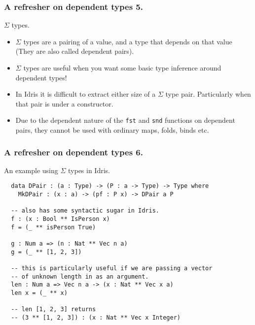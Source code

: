 \documentclass{beamer}
\begin{document}
\begin{frame}[fragile]
  \frametitle{A refresher on dependent types 5.}
  \begin{block}{$\Sigma$ types.}
  \begin{itemize}
    \item $\Sigma$ types are a pairing of a value, and a type that
            depends on that value (They are also called dependent
                  pairs).
    \item $\Sigma$ types are useful when you want some basic type
            inference around dependent types!
    \item In Idris it is difficult to extract either size of a $\Sigma$
          type pair. Particularly when that pair is under a
          constructor.
    \item Due to the dependent nature of the
            \texttt{fst} and \texttt{snd}
            functions on dependent pairs, they cannot be used with
            ordinary maps, folds, binds etc.
  \end{itemize}
  \end{block}
\end{frame}

\begin{frame}[fragile]
  \frametitle{A refresher on dependent types 6.}
  \begin{block}{An example using $\Sigma$ types in Idris.}
  \begin{verbatim}
  data DPair : (a : Type) -> (P : a -> Type) -> Type where
    MkDPair : (x : a) -> (pf : P x) -> DPair a P

  -- also has some syntactic sugar in Idris.
  f : (x : Bool ** IsPerson x)
  f = (_ ** isPerson True)

  g : Num a => (n : Nat ** Vec n a)
  g = (_ ** [1, 2, 3])

  -- this is particularly useful if we are passing a vector
  -- of unknown length in as an argument.
  len : Num a => Vec n a -> (x : Nat ** Vec x a)
  len x = (_ ** x)

  -- len [1, 2, 3] returns
  -- (3 ** [1, 2, 3]) : (x : Nat ** Vec x Integer)
  \end{verbatim}
  \end{block}
\end{frame}
\end{document}
